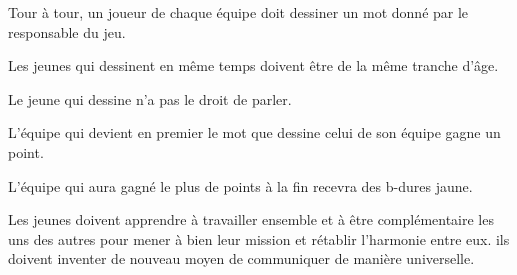 \documentclass{grand-jeu}
\begin{document}
\begin{liste-materiel}
\end{liste-materiel}

\begin{regles}
Tour à tour, un joueur de chaque équipe doit dessiner un mot donné par le responsable du jeu. 

Les jeunes qui dessinent en même temps doivent être de la même tranche d'âge. 

Le jeune qui dessine n'a pas le droit de parler. 

L'équipe qui devient en premier le mot que dessine celui de son équipe gagne un point. 

L’équipe qui aura gagné le plus de points à la fin recevra des b-dures jaune.
\end{regles}

\begin{imaginaire}
Les jeunes doivent apprendre à travailler ensemble et à être complémentaire les uns des autres pour mener à bien leur mission et rétablir l'harmonie entre eux. ils doivent inventer de nouveau moyen de communiquer de manière universelle. 
\end{imaginaire}

\begin{moments-stop}
\end{moments-stop}
\end{document}

